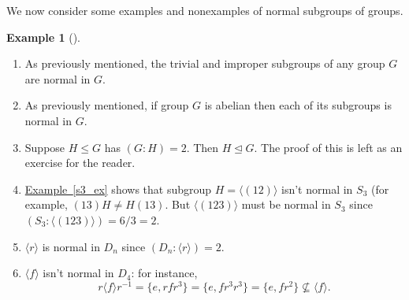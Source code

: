 \documentclass[10pt,]{book}
\theoremstyle{plain}
\theoremstyle{definition}
\theoremstyle{definition}
\theoremstyle{definition}
\newtheorem{example}[theorem]{Example}
\theoremstyle{definition}
\numberwithin{equation}{section}
\begin{document}
    We now consider some examples and nonexamples of normal subgroups of
    groups.
\begin{example}[]\label{example-80}
\leavevmode%
\begin{enumerate}
\item\hypertarget{li-488}{}
            As previously mentioned, the trivial and improper subgroups of
            any group \(G\) are normal in \(G\).
\item\hypertarget{li-489}{}
            As previously mentioned, if group \(G\) is abelian then each of
            its subgroups is normal in \(G\).
\item\hypertarget{li-490}{}
            Suppose \(H\leq G\) has \((G:H)=2\).  Then \(H \unlhd G\). The proof of this is left as an exercise for the reader.
\item\hypertarget{li-491}{}
            \hyperref[s3_ex]{Example~\ref{s3_ex}} shows that subgroup \(H=\langle (12)\rangle\) isn't normal in
            \(S_3\) (for example, \((13)H\neq H(13)\).  But \(\langle (123)\rangle\) must be
            normal in \(S_3\) since \((S_3:\langle (123)\rangle )=6/3=2.\)
\item\hypertarget{li-492}{}
            \(\langle r\rangle\) is normal in \(D_n\) since \((D_n:\langle r\rangle )=2\).
\item\hypertarget{li-493}{}
            \(\langle f\rangle\) isn't normal in \(D_4\): for instance,
\begin{equation*}

              r\langle f\rangle r^{-1}=\{e,rfr^3\}=\{e, fr^3r^3\}=\{e,fr^2\}\not\subseteq
              \langle f\rangle .
            
\end{equation*}

\end{enumerate}
\end{example}
\par
\end{document}
